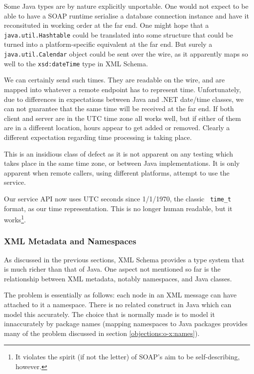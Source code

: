 Some Java types are by nature explicitly unportable. One would not
expect to be able to have a SOAP runtime serialise a database
connection instance and have it reconsituted in working order at the
far end. One might hope that a {\tt java.util.Hashtable} could be
translated into some structure that could be turned into a
platform-specific equivalent at the far end. But surely a {\tt
java.util.Calendar} object could be sent over the wire, as it
apparently maps so well to the {\tt xsd:dateTime} type in XML Schema.

We can certainly send such times. They are readable on the wire, and
are mapped into whatever a remote endpoint has to represent
time. Unfortunately, due to differences in expectations between Java
and .NET date/time classes, we can not guarantee that the same time
will be received at the far end. If both client and server are in the
UTC time zone all works well, but if either of them are in a different
location, hours appear to get added or removed. Clearly a different
expectation regarding time processing is taking place.

This is an insidious class of defect as it is not apparent on any
testing which takes place in the same time zone, or between Java
implementations. It is only apparent when remote callers, using
different platforms, attempt to use the service.

Our service API now uses UTC seconds since 1/1/1970, the classic {\tt
time\_t} format, as our time representation. This is no longer human
readable, but it works\footnote{It violates the spirit (if not the
letter) of SOAP's aim to be self-describing, however.}.

\subsubsection{XML Metadata and Namespaces}
\label{objections:o-x:namespaces}

As discussed in the previous sections, XML Schema provides a type
system that is much richer than that of Java. One aspect not mentioned
so far is the relationship between XML metadata, notably namespaces,
and Java classes.

The problem is essentially as follows: each node in an XML message can
have attached to it a namespace. There is no related construct in Java
which can model this accurately. The choice that is normally made is
to model it innaccurately by package names (mapping namespaces to Java
packages provides many of the problem discussed in section
\ref{objections:o-x:names}). 

